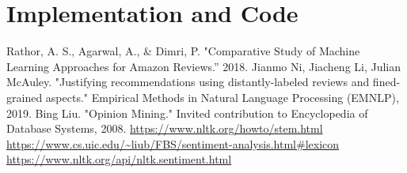 \documentclass[conference]{IEEEtran}
\begin{document}
\section{Implementation and Code}



\begin{thebibliography}{00}
 Rathor, A. S., Agarwal, A., \& Dimri, P. "Comparative Study of Machine Learning Approaches for Amazon Reviews.” 2018.
 Jianmo Ni, Jiacheng Li, Julian McAuley. "Justifying recommendations using distantly-labeled reviews and fined-grained aspects." Empirical Methods in Natural Language Processing (EMNLP), 2019. 
 Bing Liu. "Opinion Mining." Invited contribution to Encyclopedia of Database Systems, 2008.
 \url{https://www.nltk.org/howto/stem.html}
 \url{https://www.cs.uic.edu/~liub/FBS/sentiment-analysis.html#lexicon}
 \url{https://www.nltk.org/api/nltk.sentiment.html}
\end{thebibliography}
\end{document}
